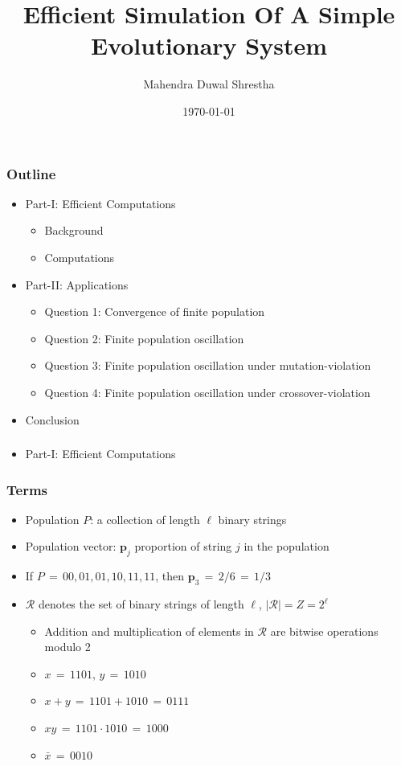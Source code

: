 \documentclass[aspectratio=169]{beamer}
\title{Efficient Simulation Of A Simple Evolutionary System}
\author{Mahendra Duwal Shrestha}
\institute{The University Of Tenessee}
\date{\today}
\begin{document}
  \begin{frame}
    \titlepage
  \end{frame}

  \begin{frame}
    \frametitle{Outline}
    \begin{itemize}
      \item Part-I: Efficient Computations
	\begin{itemize}
	  \item{Background}
	  \item{Computations}
	\end{itemize}
      \item Part-II: Applications
      \begin{itemize}
	\item{Question 1: Convergence of finite population}
	\item{Question 2: Finite population oscillation}
	\item{Question 3: Finite population oscillation under mutation-violation}
	\item{Question 4: Finite population oscillation under crossover-violation}
      \end{itemize}
      \item{Conclusion}
    \end{itemize}
  \end{frame}
  
  \begin{frame}
    \frametitle{}
    \begin{itemize}
      \item Part-I: Efficient Computations
      \end{itemize}
    \end{frame}
  
  \begin{frame}
    \frametitle{Terms}
    \begin{itemize}
      \item{Population $P$: a collection of length $\ell$ binary strings}
      \item{Population vector: $\bm{p}_j$ proportion of string $j$ in the population}
      \item{If $P \,=\, {00, 01, 01, 10, 11, 11}$, then $\bm{p}_3 \,=\, 2/6 \,=\, 1/3$}
      \vspace{0.1in}%
      \item{$\mathcal{R}$ denotes the set of binary strings of length $\ell$, $|\mathcal{R}| = Z = 2^\ell$ }
      \begin{itemize}
	\item{Addition and multiplication of elements in $\mathcal{R}$ are bitwise operations modulo 2}
	\item{$x \,=\, 1101,\, y \,=\, 1010 $}
	\item{$x + y \,=\, 1101 + 1010 \,=\, 0111$}
	\item{$xy \,=\, 1101 \cdot 1010 \,=\, 1000$}
	\item{$\bar{x} \,=\, 0010$}
      \end{itemize}
    \end{itemize}
  \end{frame}
  
\end{document}

